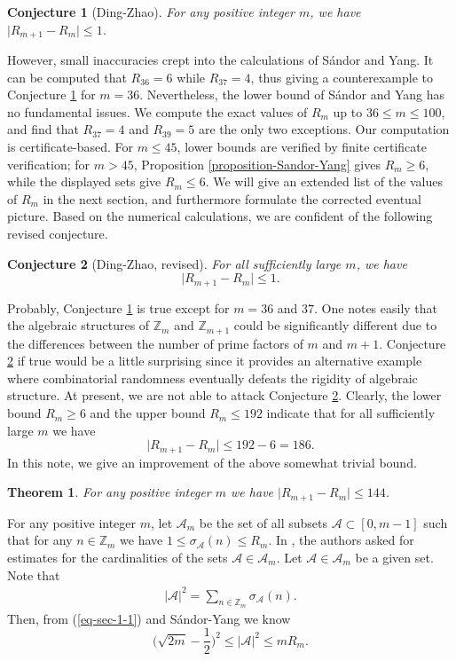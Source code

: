 \documentclass[12pt,a4paper,reqno]{amsart}
\numberwithin{equation}{section}
\theoremstyle{plain}
\newtheorem{theorem}{Theorem}
\newtheorem{conjecture}{Conjecture}
\theoremstyle{definition}
\begin{document}
\begin{conjecture}[Ding-Zhao]\label{conj:1}
For any positive integer $m$, we have $\big|R_{m+1}-R_m\big|\le 1$.
\end{conjecture}

However, small inaccuracies crept into the calculations of S\'andor and Yang.  It can be computed that $R_{36}=6$ while $R_{37}=4$, thus giving a counterexample to 
Conjecture \ref{conj:1} for $m=36$. Nevertheless, the lower bound of S\'andor and Yang has no fundamental issues. 
We compute the exact values of $R_m$ up to $36\le m\le 100$, and find that $R_{37}=4$ and $R_{39}=5$ are the only two exceptions. Our computation is certificate-based. For $m\le 45$, lower bounds are verified by finite certificate verification; for $m>45$, Proposition \ref{proposition-Sandor-Yang}
gives $R_m\ge 6$, while the displayed sets give $R_m\le 6$.
We will give an extended list of the values of $R_m$ in the next section, and furthermore formulate the corrected eventual picture. Based on the numerical calculations,  we are confident of the following revised conjecture.

\begin{conjecture}[Ding-Zhao, revised]\label{conj:2}
For all sufficiently large $m$, we have 
$$
\big|R_{m+1}-R_m\big|\le 1.
$$
\end{conjecture}

Probably, Conjecture \ref{conj:1} is true except for $m=36$ and $37$.
One notes easily that the algebraic structures of $\mathbb{Z}_{m}$ and $\mathbb{Z}_{m+1}$ could be significantly different due to the differences between the number of prime factors of $m$ and $m+1$.
Conjecture \ref{conj:2} if true would be a little surprising since it provides an alternative example where combinatorial randomness eventually defeats the rigidity of algebraic structure.
At present, we are not able to attack Conjecture \ref{conj:2}. Clearly, the lower bound $R_m\ge 6$ and the upper bound $R_m\le 192$ indicate that for all sufficiently large $m$ we have
$$
\big|R_{m+1}-R_m\big|\le 192-6=186.
$$
In this note, we give an improvement of the above somewhat trivial bound.

\begin{theorem}\label{thm:1}
    For any positive integer $m$ we have $\big|R_{m+1}-R_m\big|\le 144$.
\end{theorem}

For any positive integer $m$, let $\mathscr{A}_m$ be the set of all subsets $\mathcal{A}\subset [0, m-1]$ such that for any $n\in \mathbb{Z}_m$ we have
$
1\le \sigma_{\mathcal{A}}(n)\le R_m.
$
In \cite[Conjecture 3.4]{DZ24}, the authors asked for estimates for the cardinalities of the sets $\mathcal{A}\in \mathscr{A}_m$. Let $\mathcal{A}\in \mathscr{A}_m$ be a given set. Note that
\begin{align}\label{eq-sec-1-1}
 |\mathcal{A}|^2=\sum_{n\in \mathbb{Z}_m}\sigma_{\mathcal{A}}(n).   
\end{align}
Then, from (\ref{eq-sec-1-1}) and S\'andor-Yang \cite[Lemmas 2.2]{SY17} we know
$$
\Big(\sqrt{2m}-\frac{1}{2}\Big)^2\le |\mathcal{A}|^2\le mR_m.
$$
\end{document}
